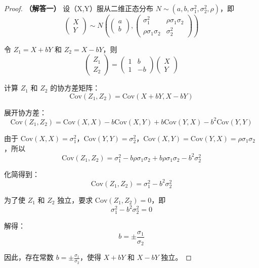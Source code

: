 \documentclass[UTF8]{report}
\theoremstyle{MyLineTheoremStyle} %
\theoremstyle{MyBlockTheoremStyle} %
\theoremstyle{MySubsubsectionStyle} %
\begin{document}
\begin{proof}
    \textbf{（解答一）}
    设（X,Y）服从二维正态分布 $N \sim (a,b,\sigma_1^2,\sigma_2^2,\rho)$，即
    \[
    \begin{pmatrix}
    X \\
    Y
    \end{pmatrix}
    \sim N\left(
    \begin{pmatrix}
    a \\
    b
    \end{pmatrix},
    \begin{pmatrix}
    \sigma_1^2 & \rho\sigma_1\sigma_2 \\
    \rho\sigma_1\sigma_2 & \sigma_2^2
    \end{pmatrix}
    \right)
    \]

    令 $Z_1 = X + bY$ 和 $Z_2 = X - bY$，则
    \[
    \begin{pmatrix}
    Z_1 \\
    Z_2
    \end{pmatrix}
    =
    \begin{pmatrix}
        1 & b \\
        1 & -b
    \end{pmatrix}
    \begin{pmatrix}
        X \\
        Y
    \end{pmatrix}
    \]
    
    计算 $Z_1$ 和 $Z_2$ 的协方差矩阵：
    \[
    \text{Cov}(Z_1, Z_2) = \text{Cov}(X + bY, X - bY)
    \]
    
    展开协方差：
    \[
    \text{Cov}(Z_1, Z_2) = \text{Cov}(X, X) - b\text{Cov}(X, Y) + b\text{Cov}(Y, X) - b^2\text{Cov}(Y, Y)
    \]
    
    由于 $\text{Cov}(X, X) = \sigma_1^2$，$\text{Cov}(Y, Y) = \sigma_2^2$，$\text{Cov}(X, Y) = \text{Cov}(Y, X) = \rho\sigma_1\sigma_2$，所以
    \[
    \text{Cov}(Z_1, Z_2) = \sigma_1^2 - b\rho\sigma_1\sigma_2 + b\rho\sigma_1\sigma_2 - b^2\sigma_2^2
    \]
    
    化简得到：
    \[
    \text{Cov}(Z_1, Z_2) = \sigma_1^2 - b^2\sigma_2^2
    \]

    为了使 $Z_1$ 和 $Z_2$ 独立，要求 $\text{Cov}(Z_1, Z_2) = 0$，即
    \[
    \sigma_1^2 - b^2\sigma_2^2 = 0
    \]

    解得：
    \[
    b = \pm \frac{\sigma_1}{\sigma_2}
    \]

    因此，存在常数 $b = \pm \frac{\sigma_1}{\sigma_2}$，使得 $X + bY$ 和 $X - bY$ 独立。\par


\end{proof}
\end{document}
